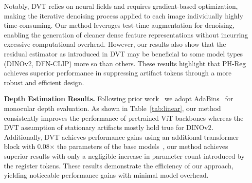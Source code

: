 \documentclass{article}
\begin{document}
Notably, DVT relies on neural fields and requires gradient-based optimization, making the iterative denoising process applied to each image individually highly time-consuming. Our method leverages test-time augmentation for denoising, enabling the generation of cleaner dense feature representations without incurring excessive computational overhead. However, our results also show that the residual estimator as introduced in DVT may be beneficial to some model types (DINOv2, DFN-CLIP) more so than others. These results highlight that PH-Reg achieves superior performance in suppressing artifact tokens through a more robust and efficient design.

\textbf{Depth Estimation Results.}  Following prior work~\citep{oquab2023dinov2,yang2024denoising} we adopt AdaBins~\citep{Bhat2021adabins} for monocular depth evaluation. 
As shown in Table~\ref{tab:linear}, our method consistently improves the performance of pretrained ViT backbones whereas the DVT assumption of stationary artifacts mostly hold true for DINOv2. Additionally, DVT achieves performance gains using an additional transformer block with 0.08× the parameters of the base models~\citep{yang2024denoising}, our method achieves superior results with only a negligible increase in parameter count introduced by the register tokens.
These results demonstrate the efficiency of our approach, yielding noticeable performance gains with minimal model overhead.
\end{document}
